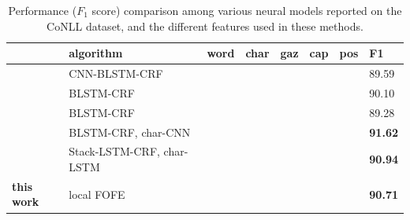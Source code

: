 \documentclass[11pt,a4paper]{article}
\newcommand{\cmark}{\ding{51}}
\newcommand{\xmark}{\ding{55}}
\begin{document}

\begin{table}
	\centering
	\begin{tabular}{|l|l|lllll|l|}
		\hline
		& algorithm & word & char & gaz & cap & pos & F1 \\
		\hline\hline
		\cite{collobert2011natural} & {CNN-BLSTM-CRF} & \cmark & \xmark & \cmark & \cmark & \xmark & 89.59  \\
		\cite{huang2015bidirectional} & {BLSTM-CRF} &\cmark & \cmark & \cmark & \cmark & \cmark & 90.10 \\
		\cite{rondeau2016lstm} & {BLSTM-CRF} & \cmark & \xmark & \cmark & \cmark & \cmark & 89.28 \\
		\cite{chiu2016named} & {BLSTM-CRF, char-CNN} & \cmark & \cmark & \cmark & \xmark & \xmark & {\bf 91.62} \\
		\cite{lample2016neural} & {Stack-LSTM-CRF, char-LSTM} & \cmark & \cmark & \xmark & \xmark & \xmark & {\bf 90.94} \\
		\hline \hline
		{\bf this work} & {local FOFE} & \cmark & \cmark & \xmark & \xmark & \xmark & {\bf 90.71} \\
		\hline
	\end{tabular}
	\caption{Performance ($F_1$ score) comparison among various neural models reported on the CoNLL dataset, and the different features used in these methods.}
	\label{tbl:nn-cmp:CoNLL03}
\end{table}
\end{document}
